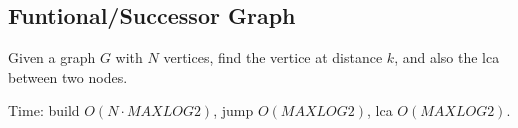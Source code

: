 \subsection{Funtional/Successor Graph}

Given a graph $G$ with $N$ vertices, find the vertice at distance $k$, and also the lca between two nodes.

Time: build $O(N \cdot MAXLOG2)$, jump $O(MAXLOG2)$, lca $O(MAXLOG2)$.
